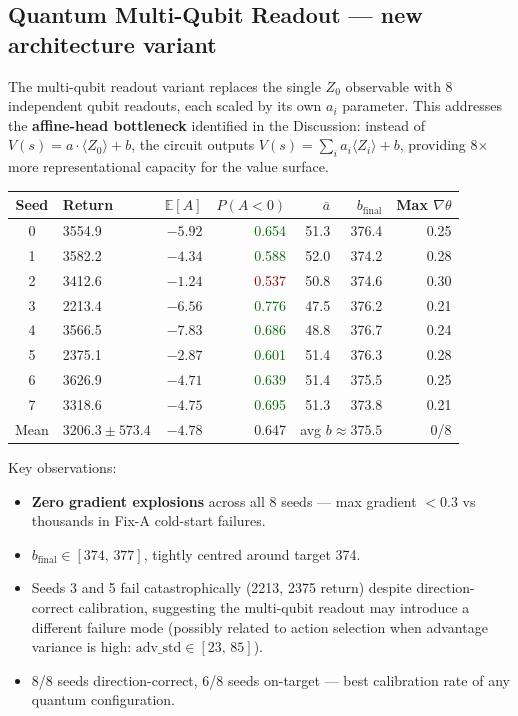 \documentclass[10pt,a4paper]{article}
\begin{document}
\subsection{Quantum Multi-Qubit Readout — new architecture variant}
\label{sec:mqr}

The multi-qubit readout variant replaces the single $Z_0$ observable with
8 independent qubit readouts, each scaled by its own $a_i$ parameter.
This addresses the \textbf{affine-head bottleneck} identified in the Discussion:
instead of $V(s)=a\cdot\langle Z_0\rangle+b$, the circuit outputs
$V(s)=\sum_i a_i \langle Z_i\rangle + b$, providing 8× more representational
capacity for the value surface.

\begin{center}
\setlength{\tabcolsep}{5pt}
\begin{tabular}{clrrrrr}
\toprule
\textbf{Seed} & \textbf{Return} & $\mathbb{E}[A]$ &
  $P(A{<}0)$ & $\bar{a}$ & $b_\text{final}$ & Max $\nabla\theta$ \\
\midrule
0 & 3554.9 & $-5.92$ & \textcolor{darkgreen}{0.654} & 51.3 & 376.4 & 0.25 \\
1 & 3582.2 & $-4.34$ & \textcolor{darkgreen}{0.588} & 52.0 & 374.2 & 0.28 \\
2 & 3412.6 & $-1.24$ & \textcolor{darkred}{0.537} & 50.8 & 374.6 & 0.30 \\
3 & 2213.4 & $-6.56$ & \textcolor{darkgreen}{0.776} & 47.5 & 376.2 & 0.21 \\
4 & 3566.5 & $-7.83$ & \textcolor{darkgreen}{0.686} & 48.8 & 376.7 & 0.24 \\
5 & 2375.1 & $-2.87$ & \textcolor{darkgreen}{0.601} & 51.4 & 376.3 & 0.28 \\
6 & 3626.9 & $-4.71$ & \textcolor{darkgreen}{0.639} & 51.4 & 375.5 & 0.25 \\
7 & 3318.6 & $-4.75$ & \textcolor{darkgreen}{0.695} & 51.3 & 373.8 & 0.21 \\
\midrule
Mean & $3206.3 \pm 573.4$ & $-4.78$ & 0.647 &
  \multicolumn{2}{r}{avg $b \approx 375.5$} & 0/8 \\
\bottomrule
\end{tabular}
\end{center}

Key observations:
\begin{itemize}
  \item \textbf{Zero gradient explosions} across all 8 seeds — max gradient $<0.3$
        vs thousands in Fix-A cold-start failures.
  \item $b_\text{final}\in[374,\,377]$, tightly centred around target 374.
  \item Seeds 3 and 5 fail catastrophically (2213, 2375 return) despite
        direction-correct calibration, suggesting the multi-qubit readout may
        introduce a different failure mode (possibly related to action selection
        when advantage variance is high: $\text{adv\_std}\in[23,\,85]$).
  \item 8/8 seeds direction-correct, 6/8 seeds on-target — best calibration
        rate of any quantum configuration.
\end{itemize}
\end{document}

